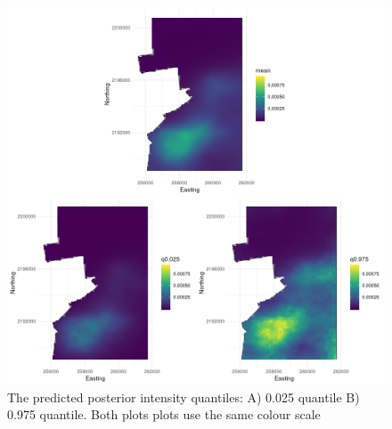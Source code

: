 \documentclass[preprint,12pt]{elsarticle}
\begin{document}
\begin{figure}[h]
	\begin{center}
		\includegraphics[scale=0.525]{figures/intensity_quantiles.png}
		\caption{The predicted posterior intensity quantiles:  A) 0.025 quantile B) 0.975 quantile.  Both plots plots use the same colour scale}
		\label{fig:intensity-quantiles}
	\end{center}
\end{figure}
\end{document}
